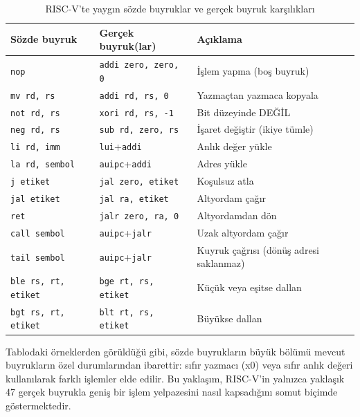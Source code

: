 \begin{table}[H]
\centering
\caption{RISC-V'te yaygın sözde buyruklar ve gerçek buyruk karşılıkları}
\label{tab:sozde-buyruklar}
\small
\begin{tabular}{lll}
\toprule
\textbf{Sözde buyruk} & \textbf{Gerçek buyruk(lar)} & \textbf{Açıklama} \\
\midrule
\texttt{nop}\index{RISC-V!nop}         & \texttt{addi zero, zero, 0}    & İşlem yapma (boş buyruk) \\
\texttt{mv rd, rs}\index{RISC-V!mv}    & \texttt{addi rd, rs, 0}        & Yazmaçtan yazmaca kopyala \\
\texttt{not rd, rs}                     & \texttt{xori rd, rs, -1}       & Bit düzeyinde DEĞİL \\
\texttt{neg rd, rs}\index{RISC-V!neg}  & \texttt{sub rd, zero, rs}      & İşaret değiştir (ikiye tümle) \\
\texttt{li rd, imm}\index{RISC-V!li}   & \texttt{lui}+\texttt{addi}     & Anlık değer yükle \\
\texttt{la rd, sembol}\index{RISC-V!la} & \texttt{auipc}+\texttt{addi}  & Adres yükle \\
\texttt{j etiket}                       & \texttt{jal zero, etiket}      & Koşulsuz atla \\
\texttt{jal etiket}                     & \texttt{jal ra, etiket}        & Altyordam çağır \\
\texttt{ret}\index{RISC-V!ret}         & \texttt{jalr zero, ra, 0}      & Altyordamdan dön \\
\texttt{call sembol}\index{RISC-V!call} & \texttt{auipc}+\texttt{jalr}  & Uzak altyordam çağır \\
\texttt{tail sembol}\index{RISC-V!tail} & \texttt{auipc}+\texttt{jalr}  & Kuyruk çağrısı (dönüş adresi saklanmaz) \\
\texttt{ble rs, rt, etiket}            & \texttt{bge rt, rs, etiket}    & Küçük veya eşitse dallan \\
\texttt{bgt rs, rt, etiket}            & \texttt{blt rt, rs, etiket}    & Büyükse dallan \\
\bottomrule
\end{tabular}
\end{table}

Tablodaki örneklerden görüldüğü gibi, sözde buyrukların büyük bölümü mevcut buyrukların özel durumlarından ibarettir: sıfır yazmacı (x0) veya sıfır anlık değeri kullanılarak farklı işlemler elde edilir. Bu yaklaşım, RISC-V'in yalnızca yaklaşık 47 gerçek buyrukla geniş bir işlem yelpazesini nasıl kapsadığını somut biçimde göstermektedir.

